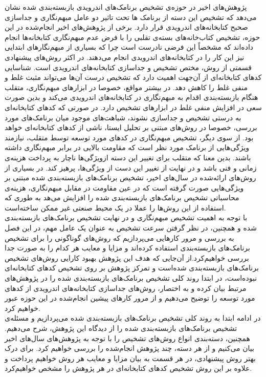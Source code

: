 \label{literature}
پژوهش‌های اخیر در حوزه‌ی تشخیص برنامک‌های اندرویدی بازبسته‌بندی شده نشان می‌دهد که تشخیص این دسته از برنامک ها تحت تاثیر دو عامل مبهم‌نگاری و جداسازی صحبح کتابخانه‌های اندرویدی قرار دارد. برخی از پژوهش‌های اخیر انجام‌شده در این حوزه، تشخیص کتاب‌خانه‌های بسته‌ی تقلبی را با فرض عدم مبهم‌نگاری کتابخانه‌ها انجام داده‌اند که مشخصاً این فرضی نادرست است چرا که بسیاری از مبهم‌نگار‌های ابتدایی نیز این کار را در کتابخانه‌های اندرویدی انجام می‌دهند. در اکثر روش‌های پیشنهادی قسمتی از روش، مختص تشخیص و جداسازی کتابخانه‌های اندرویدی‌ است. شناسایی کد‌های کتابخانه‌ای از آن‌جهت اهمیت دارد که تشخیص درست آن‌ها می‌تواند مثبت غلط و منفی غلط را کاهش دهد. در بیشتر مواقع، خصوصا در ابزار‌های مبهم‌نگاری، متقلب هنگام بازبسته‌بندی اقدام به مبهم‌نگاری در کتابخانه‌های اندرویدی می‌کند و بدین صورت سعی در افزایش منفی غلط در ابزار‌های تشخیص دارد. در صورتی که کد‌های کتابخانه‌ای به درستی تشخیص و جداسازی نشوند، شباهت‌های موجود میان برنامک‌های مورد بررسی، خصوصا در روش‌های مبتنی بر تحلیل ایستا،‌ ناشی از کد‌های کتابخانه‌ای خواهد بود. از سوی دیگر، تشخیص مبهم‌نگاری در کد‌های مورد توسعه توسط متقلب، نیازمند ویژگی‌هایی از برنامک مورد نظر است که مقاومت بالایی در برابر مبهم‌نگاری داشته‌ باشند. بدین معنا که متقلب برای تغییر این دسته ازویژگی‌ها ناچار به پرداخت هزینه‌ی زمانی و فنی باشد و در نهایت از تغییر این دست از ویژگی‌ها، پرهیز کند. در بسیاری از روش‌های ارائه‌شده در سال‌های اخیر، تشخیص برنامک‌های بازبسته‌بندی شده مبتنی بر ویژگی‌هایی صورت گرفته‌ است که در عین مقاومت در مقابل مبهم‌نگاری، هزینه‌ی محاسباتی تشخیص برنامک‌های بازبسته‌بندی شده را افزایش می‌هد به طوری که استفاده از این روش‌ها را عملا در یک محیط صنعتی غیر ممکن ساخته‌است. \\
با توجه به اهمیت تشخیص مبهم‌نگاری و در نهایت تشخیص برنامک‌های بازبسته‌بندی شده و همچنین، در نظر گرفتن سرعت تشخیص به عنوان یک عامل مهم، در این فصل به بررسی و مرور کار‌هایی می‌پردازیم که روش‌های گوناگونی را برای تشخیص برنامک‌های بازبسته‌بندی استفاده کرده‌اند و مزایا و معایب هر کدام را به صورت جدا بررسی خواهیم‌کرد.از آن‌جایی که هدف این پژوهش بهبود کارایی روش‌های تشخیص برنامک‌های بازبسته‌بندی شده‌است و تمرکز پژوهش بر روی تشخیص کد‌های کتابخانه‌ای نبوده‌است، در ابتدا روند کلی تشخیص برنامک‌های بازبسته‌بندی‌ شده را در پژوهش‌های مرتبط بیان کرده و به اختصار، روش‌های جداسازی کتابخانه‌های اندرویدی از کد‌های مورد توسعه را توضیح می‌دهیم و از مرور کار‌های پیشین انجام‌شده در این حوزه عبور خواهیم کرد.
\\
در ادامه ابتدا به روند کلی تشخیص برنامک‌های بازبسته‌بندی شده می‌پردازیم و مسئله‌ی تشخیص برنامک‌های بازبسته‌بندی شده را از دیدگاه این پژوهش، شرح می‌دهیم. همچنین، دسته‌بندی انواع روش‌های تشخیص را با توجه به پژوهش‌های سال‌های اخیر بیان‌ می‌کنیم و از هر دسته، چند پژوهش انجام‌شده را بررسی خواهیم کرد. برای درک بهتر روش‌ پیشنهادی، در هر قسمت به بیان مزایا و معایب هر روش خواهیم پرداخت و علاوه بر این روش تشخیص کد‌های ‌کتابخانه‌ای در هر پژوهش را مشخص خواهیم‌کرد.


